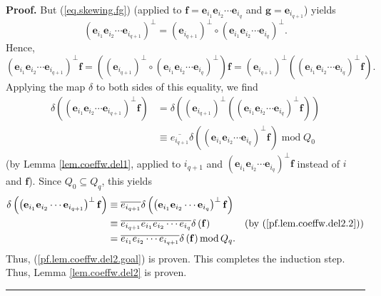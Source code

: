 \documentclass[numbers=enddot,12pt,final,onecolumn,notitlepage]{scrartcl}%
\theoremstyle{definition}
\newenvironment{proof}[1][Proof]{\noindent\textbf{#1.} }{\ \rule{0.5em}{0.5em}}
\begin{document}
\begin{proof}
But (\ref{eq.skewing.fg}) (applied to $\mathbf{f}=\mathbf{e}_{i_{1}}%
\mathbf{e}_{i_{2}}\cdots\mathbf{e}_{i_{q}}$ and $\mathbf{g}=\mathbf{e}%
_{i_{q+1}}$) yields%
\[
\left(  \mathbf{e}_{i_{1}}\mathbf{e}_{i_{2}}\cdots\mathbf{e}_{i_{q+1}}\right)
^{\perp}=\left(  \mathbf{e}_{i_{q+1}}\right)  ^{\perp}\circ\left(
\mathbf{e}_{i_{1}}\mathbf{e}_{i_{2}}\cdots\mathbf{e}_{i_{q}}\right)  ^{\perp
}.
\]
Hence,%
\[
\left(  \mathbf{e}_{i_{1}}\mathbf{e}_{i_{2}}\cdots\mathbf{e}_{i_{q+1}}\right)
^{\perp}\mathbf{f}=\left(  \left(  \mathbf{e}_{i_{q+1}}\right)  ^{\perp}%
\circ\left(  \mathbf{e}_{i_{1}}\mathbf{e}_{i_{2}}\cdots\mathbf{e}_{i_{q}%
}\right)  ^{\perp}\right)  \mathbf{f}=\left(  \mathbf{e}_{i_{q+1}}\right)
^{\perp}\left(  \left(  \mathbf{e}_{i_{1}}\mathbf{e}_{i_{2}}\cdots
\mathbf{e}_{i_{q}}\right)  ^{\perp}\mathbf{f}\right)  .
\]
Applying the map $\delta$ to both sides of this equality, we find%
\begin{align*}
\delta\left(  \left(  \mathbf{e}_{i_{1}}\mathbf{e}_{i_{2}}\cdots
\mathbf{e}_{i_{q+1}}\right)  ^{\perp}\mathbf{f}\right)   &  =\delta\left(
\left(  \mathbf{e}_{i_{q+1}}\right)  ^{\perp}\left(  \left(  \mathbf{e}%
_{i_{1}}\mathbf{e}_{i_{2}}\cdots\mathbf{e}_{i_{q}}\right)  ^{\perp}%
\mathbf{f}\right)  \right) \\
&  \equiv\overline{e_{i_{q+1}}}\delta\left(  \left(  \mathbf{e}_{i_{1}%
}\mathbf{e}_{i_{2}}\cdots\mathbf{e}_{i_{q}}\right)  ^{\perp}\mathbf{f}\right)
\operatorname{mod}Q_{0}%
\end{align*}
(by Lemma \ref{lem.coeffw.del1}, applied to $i_{q+1}$ and $\left(
\mathbf{e}_{i_{1}}\mathbf{e}_{i_{2}}\cdots\mathbf{e}_{i_{q}}\right)  ^{\perp
}\mathbf{f}$ instead of $i$ and $\mathbf{f}$). Since $Q_{0}\subseteq Q_{q}$,
this yields%
\begin{align*}
\delta\left(  \left(  \mathbf{e}_{i_{1}}\mathbf{e}_{i_{2}}\cdots
\mathbf{e}_{i_{q+1}}\right)  ^{\perp}\mathbf{f}\right)   &  \equiv
\overline{e_{i_{q+1}}}\delta\left(  \left(  \mathbf{e}_{i_{1}}\mathbf{e}%
_{i_{2}}\cdots\mathbf{e}_{i_{q}}\right)  ^{\perp}\mathbf{f}\right) \\
&  \equiv\overline{e_{i_{q+1}}}\overline{e_{i_{1}}e_{i_{2}}\cdots e_{i_{q}}%
}\delta\left(  \mathbf{f}\right)  \ \ \ \ \ \ \ \ \ \ \left(  \text{by
(\ref{pf.lem.coeffw.del2.2})}\right) \\
&  =\overline{e_{i_{1}}e_{i_{2}}\cdots e_{i_{q+1}}}\delta\left(
\mathbf{f}\right)  \operatorname{mod}Q_{q}.
\end{align*}
Thus, (\ref{pf.lem.coeffw.del2.goal}) is proven. This completes the induction
step. Thus, Lemma \ref{lem.coeffw.del2} is proven.
\end{proof}
\end{document}
